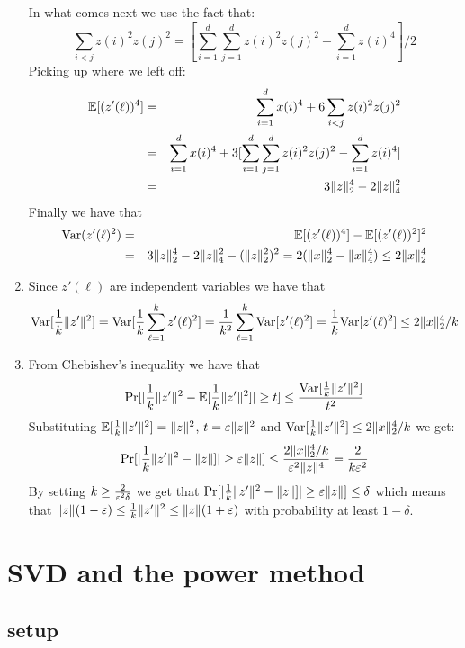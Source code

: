\documentclass{article}
\begin{document}
\begin{enumerate}
In what comes next we use the fact that:
\[
\sum_{i<j}z(i)^2 z(j)^2 = [\sum_{i=1}^{d}\sum_{j=1}^{d}z(i)^2 z(j)^2 -  \sum_{i=1}^{d}z(i)^4]/2
\]
Picking up where we left off:
\begin{eqnarray*}
{\mathbb E}[(z'(\ell))^4] &=& \sum_{i=1}^{d}x(i)^4 + 6 \sum_{i<j}z(i)^2 z(j)^2\\
&=& \sum_{i=1}^{d}x(i)^4 + 3[\sum_{i=1}^{d}\sum_{j=1}^{d}z(i)^2 z(j)^2 -  \sum_{i=1}^{d}z(i)^4] \\
&=& 3\|z\|_{2}^{4} - 2\|z\|_4^2 
\end{eqnarray*}
Finally we have that 
\begin{eqnarray*}
{\operatorname{Var}}( z'(\ell)^2) &=& {\mathbb E}[(z'(\ell))^4]  -{\mathbb E}[(z'(\ell))^2]^2 \\
&=& 3\|z\|_{2}^{4} - 2\|z\|_4^2 - (\|z\|_{2}^{2})^2 = 2(\|x\|_2^4 - \|x\|_4^4) \le 2\|x\|_2^4 
\end{eqnarray*}
\item Since $z'(\ell)$ are independent variables we have that 
\[
{\operatorname{Var}}[\frac{1}{k}\|z'\|^2] = {\operatorname{Var}}[\frac{1}{k} \sum_{\ell=1}^{k}z'(\ell)^2] =  \frac{1}{k^2}\sum_{\ell=1}^{k}{\operatorname{Var}}[z'(\ell)^2] = \frac{1}{k}{\operatorname{Var}}[z'(\ell)^2] \le 2\|x\|_2^4/k
\]
\item From Chebishev's inequality we have that 
\[
\Pr[|\frac{1}{k}\|z'\|^2 - {\mathbb E}[\frac{1}{k}\|z'\|^2]| \ge t] \le \frac{{\operatorname{Var}}[\frac{1}{k}\|z'\|^2]}{t^2}
\]
Substituting ${\mathbb E}[\frac{1}{k}\|z'\|^2] = \|z\|^2$, $t = \varepsilon\|z\|^2$ and ${\operatorname{Var}}[\frac{1}{k}\|z'\|^2] \le 2\|x\|_2^4/k$ we get:
\[
\Pr[|\frac{1}{k}\|z'\|^2 - \|z\|]| \ge \varepsilon \|z\|] \le \frac{2\|x\|_2^4/k}{\varepsilon^2\|z\|^4} = \frac{2}{k\varepsilon^2} 
\]
By setting $k \ge \frac{2}{\varepsilon^2 \delta}$ we get that $\Pr[|\frac{1}{k}\|z'\|^2 - \|z\|]| \ge \varepsilon \|z\|] \le \delta$ which means that
$\|z\|(1-\varepsilon)\le \frac{1}{k}\|z'\|^2 \le \|z\|(1+\varepsilon)$ with probability at least $1-\delta$.
\end{enumerate}









\pagebreak

\section{SVD and the power method}
\subsection*{setup}
\end{document}
